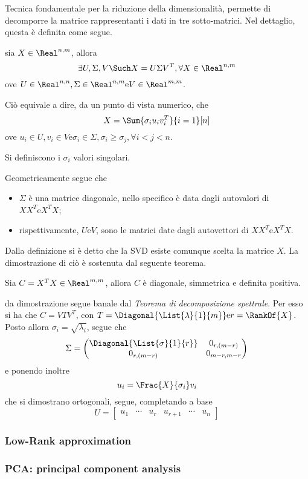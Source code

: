 \documentclass{subfiles}
\begin{document}
Tecnica fondamentale per la riduzione della dimensionalità, permette di decomporre la matrice rappresentanti i dati in tre sotto-matrici.
Nel dettaglio, questa è definita come segue.
\begin{Definition*}
    sia $X \in \Real^{n,m}$, allora
    $$
        \exists U, \Sigma, V \Such X = U\Sigma V^{T}, \forall X \in \Real^{n, m}
    $$
    ove $U \in \Real^{n,n} , \Sigma \in \Real^{n,m} \text{e} V \in \Real^{m,m}$.
\end{Definition*}
Ciò equivale a dire, da un punto di vista numerico, che
$$
    X = \Sum{\sigma_{i}u_{i}v_{i}^{T}}{i = 1}[n]
$$
ove $u_{i} \in U, v_{i} \in V \text{e} \sigma_{i} \in \Sigma, \sigma_{i} \ge \sigma_{j}, \forall i < j < n$.\\
\begin{MarginNote}
    Si definiscono i $\sigma_{i}$ valori singolari.
\end{MarginNote}
Geometricamente segue che
\begin{itemize}
    \item $\Sigma$ è una matrice diagonale, nello specifico è data dagli autovalori di $XX^{T} \text{e} X^{T}X$;
    \item rispettivamente, $U \text{e} V$, sono le matrici date dagli autovettori di $XX^{T} \text{e} X^{T}X$.
\end{itemize}

Dalla definizione si è detto che la SVD esiste comunque scelta la matrice $X$. La dimostrazione di ciò è sostenuta dal seguente teorema.
\begin{Theorem*}
    Sia $C = X^{T}X \in \Real^{m,m}$, allora $C$ è diagonale, simmetrica e definita positiva.
    \begin{Proof*}
        da dimostrazione segue banale dal \emph{Teorema di decomposizione spettrale}.
        Per esso si ha che $C = V T V^{T}$, con $T = \Diagonal{\List{\lambda}{1}{m}} \text{e} r = \RankOf{X}$.
        Posto allora $\sigma_{i} = \sqrt{\lambda_{i}}$, segue che
        $$\Sigma = \begin{pmatrix}
                \Diagonal{\List{\sigma}{1}{r}} & 0_{r, (m - r)}   \\
                0_{r, (m - r)}                 & 0_{m - r, m - r} \\
            \end{pmatrix}$$
        e ponendo inoltre
        $$
            u_{i} = \Frac{X}{\sigma_{i}}v_{i}
        $$
        che si dimostrano ortogonali, segue, completando a base
        $$U = \begin{bmatrix}
                u_{1} & \cdots & u_{r} & u_{r + 1} & \cdots & u_{n}
            \end{bmatrix}$$
    \end{Proof*}
\end{Theorem*}
\clearpage

\subsubsection{Low-Rank approximation}


\subsubsection{PCA: principal component analysis}

\end{document}
